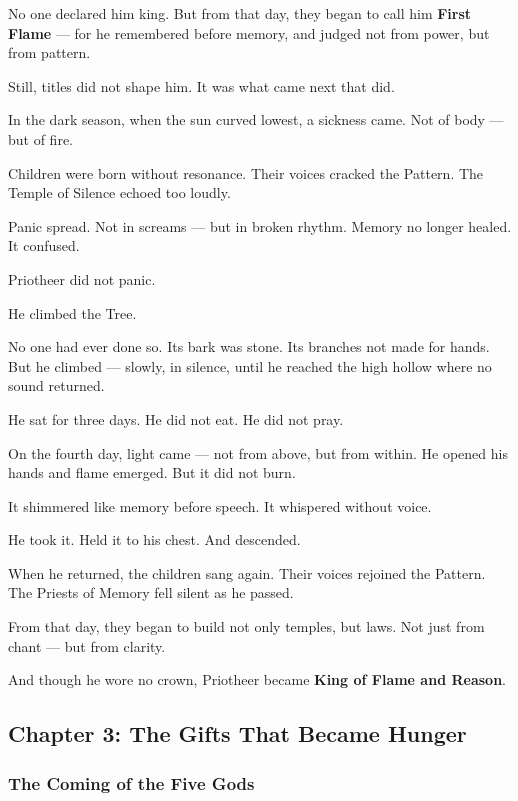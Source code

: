 \documentclass[12pt]{article}
\begin{document}
No one declared him king.  
But from that day, they began to call him \textbf{First Flame} —  
for he remembered before memory,  
and judged not from power, but from pattern.

Still, titles did not shape him.  
It was what came next that did.

In the dark season, when the sun curved lowest, a sickness came.  
Not of body — but of fire.

Children were born without resonance.  
Their voices cracked the Pattern.  
The Temple of Silence echoed too loudly.

Panic spread.  
Not in screams — but in broken rhythm.  
Memory no longer healed. It confused.

Priotheer did not panic.

He climbed the Tree.

No one had ever done so.  
Its bark was stone. Its branches not made for hands.  
But he climbed — slowly, in silence, until he reached the high hollow where no sound returned.

He sat for three days.  
He did not eat.  
He did not pray.

On the fourth day, light came — not from above, but from within.  
He opened his hands and flame emerged.  
But it did not burn.

It shimmered like memory before speech.  
It whispered without voice.

He took it.  
Held it to his chest.  
And descended.

When he returned, the children sang again.  
Their voices rejoined the Pattern.  
The Priests of Memory fell silent as he passed.

From that day, they began to build not only temples, but laws.  
Not just from chant — but from clarity.

And though he wore no crown, Priotheer became  
\textbf{King of Flame and Reason}.

\newpage

\subsection{Chapter 3: The Gifts That Became Hunger}

\vspace{.5in}

\subsubsection{The Coming of the Five Gods}
\end{document}
